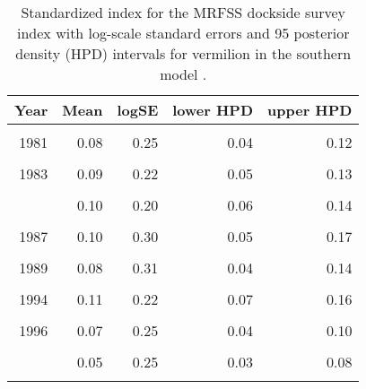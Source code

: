 \documentclass[11pt,
  english,
  a4paper,
]{article}
\begin{document}
\begin{table}

\caption{\label{tab:tab-index-mrfss}Standardized index for the MRFSS dockside survey index with log-scale standard errors and 95%
       posterior density (HPD) intervals for vermilion in the southern model .}
\centering
\begin{tabular}[t]{rrrrr}
\toprule
Year & Mean & logSE & lower HPD & upper HPD\\
\midrule
\cellcolor{gray!6}{1980} & \cellcolor{gray!6}{0.03} & \cellcolor{gray!6}{0.30} & \cellcolor{gray!6}{0.02} & \cellcolor{gray!6}{0.05}\\
1981 & 0.08 & 0.25 & 0.04 & 0.12\\
\cellcolor{gray!6}{1982} & \cellcolor{gray!6}{0.06} & \cellcolor{gray!6}{0.25} & \cellcolor{gray!6}{0.03} & \cellcolor{gray!6}{0.09}\\
1983 & 0.09 & 0.22 & 0.05 & 0.13\\
\cellcolor{gray!6}{1984} & \cellcolor{gray!6}{0.12} & \cellcolor{gray!6}{0.17} & \cellcolor{gray!6}{0.08} & \cellcolor{gray!6}{0.16}\\
\addlinespace
1985 & 0.10 & 0.20 & 0.06 & 0.14\\
\cellcolor{gray!6}{1986} & \cellcolor{gray!6}{0.18} & \cellcolor{gray!6}{0.18} & \cellcolor{gray!6}{0.13} & \cellcolor{gray!6}{0.26}\\
1987 & 0.10 & 0.30 & 0.05 & 0.17\\
\cellcolor{gray!6}{1988} & \cellcolor{gray!6}{0.16} & \cellcolor{gray!6}{0.22} & \cellcolor{gray!6}{0.10} & \cellcolor{gray!6}{0.25}\\
1989 & 0.08 & 0.31 & 0.04 & 0.14\\
\addlinespace
\cellcolor{gray!6}{1993} & \cellcolor{gray!6}{0.06} & \cellcolor{gray!6}{0.28} & \cellcolor{gray!6}{0.03} & \cellcolor{gray!6}{0.10}\\
1994 & 0.11 & 0.22 & 0.07 & 0.16\\
\cellcolor{gray!6}{1995} & \cellcolor{gray!6}{0.04} & \cellcolor{gray!6}{0.42} & \cellcolor{gray!6}{0.02} & \cellcolor{gray!6}{0.09}\\
1996 & 0.07 & 0.25 & 0.04 & 0.10\\
\cellcolor{gray!6}{1997} & \cellcolor{gray!6}{0.04} & \cellcolor{gray!6}{0.46} & \cellcolor{gray!6}{0.02} & \cellcolor{gray!6}{0.09}\\
\addlinespace
1998 & 0.05 & 0.25 & 0.03 & 0.08\\
\cellcolor{gray!6}{1999} & \cellcolor{gray!6}{0.15} & \cellcolor{gray!6}{0.17} & \cellcolor{gray!6}{0.10} & \cellcolor{gray!6}{0.21}\\
\bottomrule
\end{tabular}
\end{table}
\end{document}
